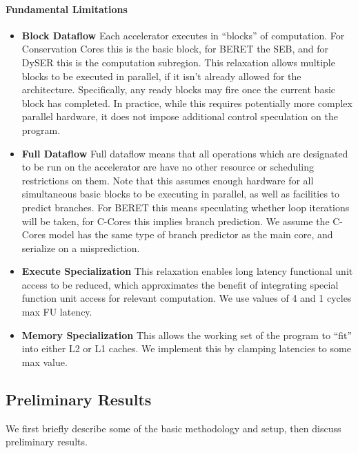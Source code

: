 \paragraph{Fundamental Limitations}
\begin{itemize}

\item \textbf{Block Dataflow} Each accelerator executes in ``blocks'' of
computation.  For Conservation Cores this is the basic block, for BERET the
SEB, and for DySER this is the computation subregion.  This relaxation allows
multiple blocks to be executed in parallel, if it isn't already allowed for the
architecture.  Specifically, any ready blocks may fire once the current basic
block has completed.  In practice, while this requires potentially more complex
parallel hardware, it does not impose additional control speculation on the program. 

\item \textbf{Full Dataflow} Full dataflow means that all operations which are
designated to be run on the accelerator are have no other resource or
scheduling restrictions on them.  Note that this assumes enough hardware for
all simultaneous basic blocks to be executing in parallel, as well as facilities
to predict branches.  For BERET this means speculating 
whether loop iterations will be taken, for C-Cores this implies branch prediction.
We assume the C-Cores model has the same type of branch predictor as the
main core, and serialize on a misprediction.

\item \textbf{Execute Specialization}
This relaxation enables long latency functional unit access to be reduced, 
which approximates the benefit of integrating special function unit access 
for relevant computation. We use values of 4 and 1 cycles max FU latency.
 
\item \textbf{Memory Specialization}
This allows the working set of the program to ``fit'' into either L2 or L1 caches.
We implement this by clamping latencies to some max value.
\end{itemize}

\subsection{Preliminary Results}

We first briefly describe some of the basic methodology and setup, 
then discuss preliminary results.

